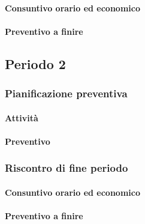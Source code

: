 \paragraph{Consuntivo orario ed economico}


\paragraph{Preventivo a finire}



\subsection{Periodo 2}

\subsubsection{Pianificazione preventiva}

\paragraph{Attività}

\planningTable{
	
}



\paragraph{Preventivo}

\smallPreventivoTable{
	
}

\subsubsection{Riscontro di fine periodo}


\paragraph{Consuntivo orario ed economico}


\paragraph{Preventivo a finire}

\pafTable{
	
}